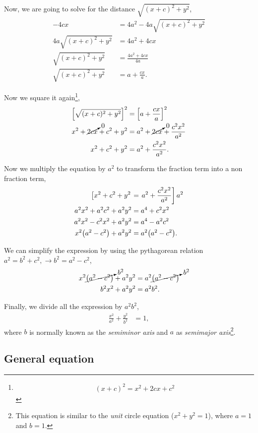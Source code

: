 \documentclass[../main-notes.tex]{subfiles}
\begin{document}
Now, we are going to solve for the distance $\sqrt{(x+c)^2+y^2}$,
\begin{align*}
    -4cx &= 4a^2 -4a\sqrt{(x+c)^2+y^2} \\
    4a\sqrt{(x+c)^2+y^2} &= 4a^2 + 4cx \\
    \sqrt{(x+c)^2+y^2} &= \frac{4a^2 + 4cx}{4a} \\
    \sqrt{(x+c)^2+y^2} &= a + \frac{cx}{a}.
\end{align*}

Now we square it again\footnote{
    \begin{gather*}
        (x+c)^2 = x^2 +2cx + c^2
    \end{gather*}
},
\begin{align*}
    \qty[\sqrt{(x+c)^2+y^2}]^2 &= \qty[a + \frac{cx}{a}]^2 \\
    x^2 +\cancelto{0}{2cx} + c^2 + y^2 &= a^2 +\cancelto{0}{2cx} + \frac{c^2x^2}{a^2} \\
    x^2 + c^2 + y^2 &= a^2 + \frac{c^2x^2}{a^2}.
\end{align*}

Now we multiply the equation by $a^2$ to transform the fraction term into a non fraction term,
\begin{align*}
    \left[x^2 + c^2 + y^2\right. &= \left.a^2 + \frac{c^2x^2}{a^2}\right]a^2 \\
    a^2x^2 + a^2c^2 + a^2y^2 &= a^4 + c^2x^2 \\
    a^2x^2 - c^2x^2 + a^2y^2 &= a^4 - a^2c^2  \\
    x^2\qty(a^2 - c^2) + a^2y^2 &= a^2\qty(a^2 - c^2).
\end{align*}

We can simplify the expression by using the pythagorean relation $a^2 = b^2 + c^2,\to b^2 = a^2-c^2$,
\begin{align*}
    x^2\cancelto{b^2}{\qty(a^2 - c^2)} + a^2y^2 &= a^2\cancelto{b^2}{\qty(a^2 - c^2)} \\
    b^2x^2 + a^2y^2 &= a^2b^2.
\end{align*}

Finally, we divide all the expression by $a^2b^2$,
\begin{align*}
    \frac{x^2}{a^2} + \frac{y^2}{b^2} &= 1,
\end{align*}
where $b$ is normally known as the \textit{semiminor axis} and $a$ as \textit{semimajor axis}\footnote{
    This equation is similar to the \textit{unit} circle equation ($x^2 + y^2 = 1$), where $a=1$ and $b=1$.
}.

\subsection{General equation}
\end{document}
